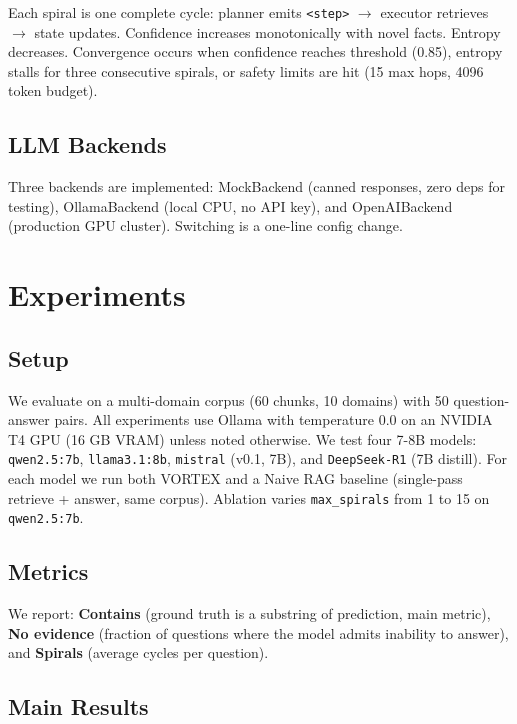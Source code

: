 \documentclass{zapiski}
\begin{document}
Each spiral is one complete cycle: planner emits \texttt{<step>} $\rightarrow$ executor retrieves $\rightarrow$ state updates. Confidence increases monotonically with novel facts. Entropy decreases. Convergence occurs when confidence reaches threshold (0.85), entropy stalls for three consecutive spirals, or safety limits are hit (15 max hops, 4096 token budget).

\subsection{LLM Backends}

Three backends are implemented: MockBackend (canned responses, zero deps for testing), OllamaBackend (local CPU, no API key), and OpenAIBackend (production GPU cluster). Switching is a one-line config change.

\section{Experiments}
\label{sec:experiments}

\subsection{Setup}

We evaluate on a multi-domain corpus (60 chunks, 10 domains) with 50 question-answer pairs. All experiments use Ollama with temperature 0.0 on an NVIDIA T4 GPU (16 GB VRAM) unless noted otherwise. We test four 7-8B models: \texttt{qwen2.5:7b}, \texttt{llama3.1:8b}, \texttt{mistral} (v0.1, 7B), and \texttt{DeepSeek-R1} (7B distill). For each model we run both VORTEX and a Naive RAG baseline (single-pass retrieve + answer, same corpus). Ablation varies \texttt{max\_spirals} from 1 to 15 on \texttt{qwen2.5:7b}.

\subsection{Metrics}

We report: \textbf{Contains} (ground truth is a substring of prediction, main metric), \textbf{No evidence} (fraction of questions where the model admits inability to answer), and \textbf{Spirals} (average cycles per question).

\subsection{Main Results}
\end{document}
